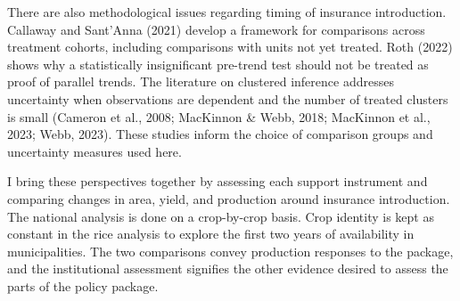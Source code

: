There are also methodological issues regarding timing of insurance introduction. Callaway and Sant'Anna (2021) develop a framework for comparisons across treatment cohorts, including comparisons with units not yet treated. Roth (2022) shows why a statistically insignificant pre-trend test should not be treated as proof of parallel trends. The literature on clustered inference addresses uncertainty when observations are dependent and the number of treated clusters is small (Cameron et al., 2008; MacKinnon \& Webb, 2018; MacKinnon et al., 2023; Webb, 2023). These studies inform the choice of comparison groups and uncertainty measures used here.

I bring these perspectives together by assessing each support instrument and comparing changes in area, yield, and production around insurance introduction. The national analysis is done on a crop-by-crop basis. Crop identity is kept as constant in the rice analysis to explore the first two years of availability in municipalities. The two comparisons convey production responses to the package, and the institutional assessment signifies the other evidence desired to assess the parts of the policy package.
